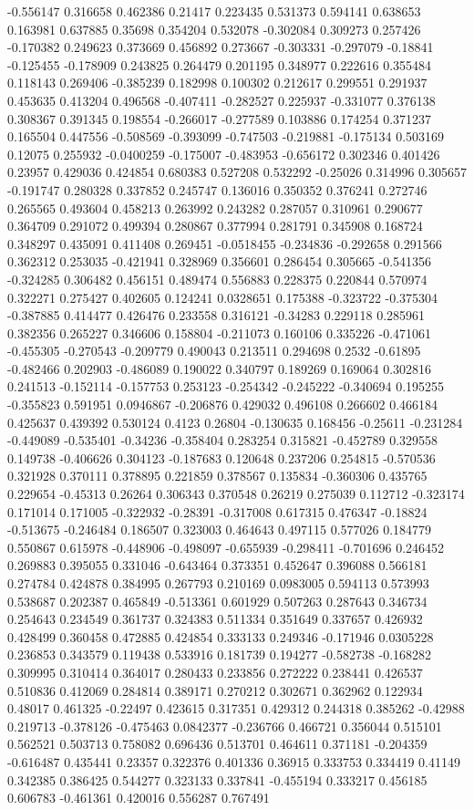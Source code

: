 -0.556147 0.316658 0.462386 0.21417 0.223435 0.531373 0.594141 0.638653 0.163981 0.637885 0.35698 0.354204 0.532078 -0.302084 0.309273 0.257426 -0.170382 0.249623 0.373669 0.456892 0.273667 -0.303331 -0.297079 -0.18841 -0.125455 -0.178909 0.243825 0.264479 0.201195 0.348977 0.222616 0.355484 0.118143 0.269406 -0.385239 0.182998 0.100302 0.212617 0.299551 0.291937 0.453635 0.413204 0.496568 -0.407411 -0.282527 0.225937 -0.331077 0.376138 0.308367 0.391345 0.198554 -0.266017 -0.277589 0.103886 0.174254 0.371237 0.165504 0.447556 -0.508569 -0.393099 -0.747503 -0.219881 -0.175134 0.503169 0.12075 0.255932 -0.0400259 -0.175007 -0.483953 -0.656172 0.302346 0.401426 0.23957 0.429036 0.424854 0.680383 0.527208 0.532292 -0.25026 0.314996 0.305657 -0.191747 0.280328 0.337852 0.245747 0.136016 0.350352 0.376241 0.272746 0.265565 0.493604 0.458213 0.263992 0.243282 0.287057 0.310961 0.290677 0.364709 0.291072 0.499394 0.280867 0.377994 0.281791 0.345908 0.168724 0.348297 0.435091 0.411408 0.269451 -0.0518455 -0.234836 -0.292658 0.291566 0.362312 0.253035 -0.421941 0.328969 0.356601 0.286454 0.305665 -0.541356 -0.324285 0.306482 0.456151 0.489474 0.556883 0.228375 0.220844 0.570974 0.322271 0.275427 0.402605 0.124241 0.0328651 0.175388 -0.323722 -0.375304 -0.387885 0.414477 0.426476 0.233558 0.316121 -0.34283 0.229118 0.285961 0.382356 0.265227 0.346606 0.158804 -0.211073 0.160106 0.335226 -0.471061 -0.455305 -0.270543 -0.209779 0.490043 0.213511 0.294698 0.2532 -0.61895 -0.482466 0.202903 -0.486089 0.190022 0.340797 0.189269 0.169064 0.302816 0.241513 -0.152114 -0.157753 0.253123 -0.254342 -0.245222 -0.340694 0.195255 -0.355823 0.591951 0.0946867 -0.206876 0.429032 0.496108 0.266602 0.466184 0.425637 0.439392 0.530124 0.4123 0.26804 -0.130635 0.168456 -0.25611 -0.231284 -0.449089 -0.535401 -0.34236 -0.358404 0.283254 0.315821 -0.452789 0.329558 0.149738 -0.406626 0.304123 -0.187683 0.120648 0.237206 0.254815 -0.570536 0.321928 0.370111 0.378895 0.221859 0.378567 0.135834 -0.360306 0.435765 0.229654 -0.45313 0.26264 0.306343 0.370548 0.26219 0.275039 0.112712 -0.323174 0.171014 0.171005 -0.322932 -0.28391 -0.317008 0.617315 0.476347 -0.18824 -0.513675 -0.246484 0.186507 0.323003 0.464643 0.497115 0.577026 0.184779 0.550867 0.615978 -0.448906 -0.498097 -0.655939 -0.298411 -0.701696 0.246452 0.269883 0.395055 0.331046 -0.643464 0.373351 0.452647 0.396088 0.566181 0.274784 0.424878 0.384995 0.267793 0.210169 0.0983005 0.594113 0.573993 0.538687 0.202387 0.465849 -0.513361 0.601929 0.507263 0.287643 0.346734 0.254643 0.234549 0.361737 0.324383 0.511334 0.351649 0.337657 0.426932 0.428499 0.360458 0.472885 0.424854 0.333133 0.249346 -0.171946 0.0305228 0.236853 0.343579 0.119438 0.533916 0.181739 0.194277 -0.582738 -0.168282 0.309995 0.310414 0.364017 0.280433 0.233856 0.272222 0.238441 0.426537 0.510836 0.412069 0.284814 0.389171 0.270212 0.302671 0.362962 0.122934 0.48017 0.461325 -0.22497 0.423615 0.317351 0.429312 0.244318 0.385262 -0.42988 0.219713 -0.378126 -0.475463 0.0842377 -0.236766 0.466721 0.356044 0.515101 0.562521 0.503713 0.758082 0.696436 0.513701 0.464611 0.371181 -0.204359 -0.616487 0.435441 0.23357 0.322376 0.401336 0.36915 0.333753 0.334419 0.41149 0.342385 0.386425 0.544277 0.323133 0.337841 -0.455194 0.333217 0.456185 0.606783 -0.461361 0.420016 0.556287 0.767491 